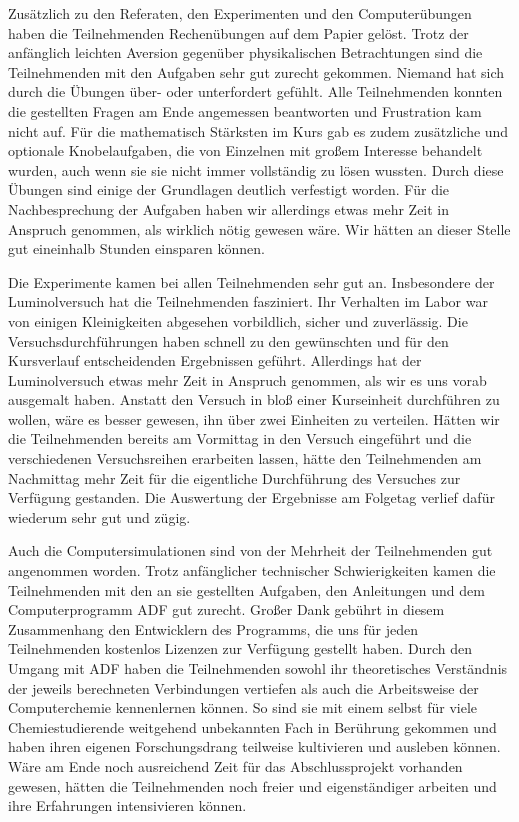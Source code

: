 \documentclass{scrartcl}
\begin{document}
Zus{\"a}tzlich zu den Referaten, den Experimenten und den Computer{\"u}bungen haben die Teilnehmenden Rechen{\"u}bungen auf dem Papier gel{\"o}st. Trotz der anf{\"a}nglich leichten Aversion gegen{\"u}ber physikalischen Betrachtungen sind die Teilnehmenden mit den Aufgaben sehr gut zurecht gekommen. Niemand hat sich durch die {\"U}bungen {\"u}ber- oder unterfordert gef{\"u}hlt. Alle Teilnehmenden konnten die gestellten Fragen am Ende angemessen beantworten und Frustration kam nicht auf. F{\"u}r die mathematisch St{\"a}rksten im Kurs gab es zudem zus{\"a}tzliche und optionale Knobelaufgaben, die von Einzelnen mit gro{\ss}em Interesse behandelt wurden, auch wenn sie sie nicht immer vollst{\"a}ndig zu l{\"o}sen wussten. Durch diese {\"U}bungen sind einige der Grundlagen deutlich verfestigt worden. F{\"u}r die Nachbesprechung der Aufgaben haben wir allerdings etwas mehr Zeit in Anspruch genommen, als wirklich n{\"o}tig gewesen w{\"a}re. Wir h{\"a}tten an dieser Stelle gut eineinhalb Stunden einsparen k{\"o}nnen.\medskip

Die Experimente kamen bei allen Teilnehmenden sehr gut an. Insbesondere der Luminolversuch hat die Teilnehmenden fasziniert. Ihr Verhalten im Labor war von einigen Kleinigkeiten abgesehen vorbildlich, sicher und zuverl{\"a}ssig. Die Versuchsdurchf{\"u}hrungen haben schnell zu den gew{\"u}nschten und f{\"u}r den Kursverlauf entscheidenden Ergebnissen gef{\"u}hrt. Allerdings hat der Luminolversuch etwas mehr Zeit in Anspruch genommen, als wir es uns vorab ausgemalt haben. Anstatt den Versuch in blo{\ss} einer Kurseinheit durchf{\"u}hren zu wollen, w{\"a}re es besser gewesen, ihn {\"u}ber zwei Einheiten zu verteilen. H{\"a}tten wir die Teilnehmenden bereits am Vormittag in den Versuch eingef{\"u}hrt und die verschiedenen Versuchsreihen erarbeiten lassen, h{\"a}tte den Teilnehmenden am Nachmittag mehr Zeit f{\"u}r die eigentliche Durchf{\"u}hrung des Versuches zur Verf{\"u}gung gestanden. Die Auswertung der Ergebnisse am Folgetag verlief daf{\"u}r wiederum sehr gut und z{\"u}gig.\medskip

Auch die Computersimulationen sind von der Mehrheit der Teilnehmenden gut angenommen worden. Trotz anf{\"a}nglicher technischer Schwierigkeiten kamen die Teilnehmenden mit den an sie gestellten Aufgaben, den Anleitungen und dem Computerprogramm ADF gut zurecht. Gro{\ss}er Dank geb{\"u}hrt in diesem Zusammenhang den Entwicklern des Programms, die uns f{\"u}r jeden Teilnehmenden kostenlos Lizenzen zur Verf{\"u}gung gestellt haben. Durch den Umgang mit ADF haben die Teilnehmenden sowohl ihr theoretisches Verst{\"a}ndnis der jeweils berechneten Verbindungen vertiefen als auch die Arbeitsweise der Computerchemie kennenlernen k{\"o}nnen. So sind sie mit einem selbst f{\"u}r viele Chemiestudierende weitgehend unbekannten Fach in Ber{\"u}hrung gekommen und haben ihren eigenen Forschungsdrang teilweise kultivieren und ausleben k{\"o}nnen. W{\"a}re am Ende noch ausreichend Zeit f{\"u}r das Abschlussprojekt vorhanden gewesen, h{\"a}tten die Teilnehmenden noch freier und eigenst{\"a}ndiger arbeiten und ihre Erfahrungen intensivieren k{\"o}nnen.\medskip
\end{document}
